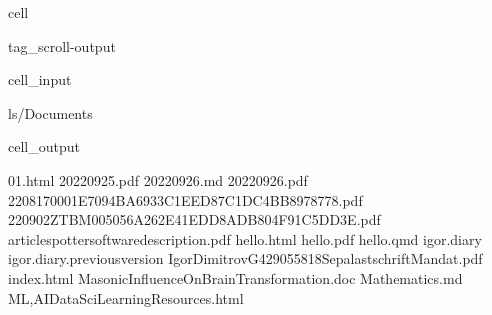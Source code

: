 \documentclass[a4paper,10pt,english]{jupyterBook}
\begin{document}
\begin{sphinxuseclass}{cell}
\begin{sphinxuseclass}{tag_scroll-output}\begin{sphinxVerbatimInput}

\begin{sphinxuseclass}{cell_input}
\begin{sphinxVerbatim}[commandchars=\\\{\}]
ls\PYGZti{}/Documents
\end{sphinxVerbatim}

\end{sphinxuseclass}\end{sphinxVerbatimInput}
\begin{sphinxVerbatimOutput}

\begin{sphinxuseclass}{cell_output}
\begin{sphinxVerbatim}[commandchars=\\\{\}]
 01.html
 2022\PYGZhy{}09\PYGZhy{}25.pdf
 2022\PYGZhy{}09\PYGZhy{}26.md
 2022\PYGZhy{}09\PYGZhy{}26.pdf
 220817\PYGZus{}0001E7094BA6933C1EED87C1DC4BB8978778.pdf
 220902\PYGZus{}ZTBM005056A262E41EDD8ADB804F91C5DD3E.pdf
 article\PYGZhy{}spotter\PYGZhy{}software\PYGZhy{}description.pdf
 hello.html
 hello.pdf
 hello.qmd
 igor.diary
 igor.diary.\PYGZti{}previousversion\PYGZti{}
 IgorDimitrov\PYGZus{}G429055818\PYGZus{}Sepa\PYGZus{}lastschriftMandat.pdf
 index.html
 MasonicInfluenceOnBrainTransformation.doc
 Mathematics.md
 ML,\PYGZhy{}AI\PYGZhy{}\PYGZhy{}\PYGZhy{}Data\PYGZhy{}Sci\PYGZhy{}Learning\PYGZhy{}Resources.html

\end{sphinxVerbatim}
\end{sphinxuseclass}
\end{sphinxVerbatimOutput}
\end{sphinxuseclass}
\end{sphinxuseclass}
\end{document}
